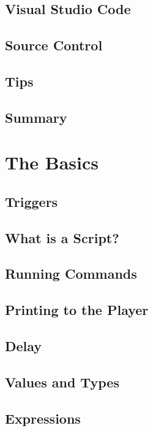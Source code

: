 \documentclass[oneside]{book}
\begin{document}
\section{Visual Studio Code}
\blindtext

\section{Source Control}
\blindtext

\section{Tips}
\blindtext

\section{Summary}
\blindtext

\chapter{The Basics}

\section{Triggers}
\blindtext

\section{What is a Script?}
\blindtext

\section{Running Commands}
\blindtext

\section{Printing to the Player}
\blindtext

\section{Delay}
\blindtext

\section{Values and Types}
\blindtext

\section{Expressions}
\blindtext
\end{document}
